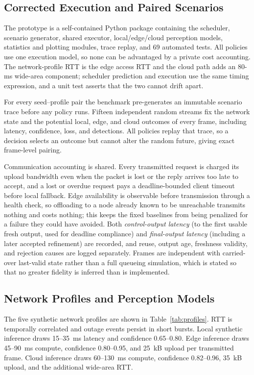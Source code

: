 \documentclass[conference,a4paper]{IEEEtran}
\begin{document}
\subsection{Corrected Execution and Paired Scenarios}
The prototype is a self-contained Python package containing the scheduler, scenario generator, shared executor, local/edge/cloud perception models, statistics and plotting modules, trace replay, and 69 automated tests. All policies use one execution model, so none can be advantaged by a private cost accounting. The network-profile RTT is the edge access RTT and the cloud path adds an 80-ms wide-area component; scheduler prediction and execution use the same timing expression, and a unit test asserts that the two cannot drift apart.

For every seed--profile pair the benchmark pre-generates an immutable scenario trace before any policy runs. Fifteen independent random streams fix the network state and the potential local, edge, and cloud outcomes of every frame, including latency, confidence, loss, and detections. All policies replay that trace, so a decision selects an outcome but cannot alter the random future, giving exact frame-level pairing.

Communication accounting is shared. Every transmitted request is charged its upload bandwidth even when the packet is lost or the reply arrives too late to accept, and a lost or overdue request pays a deadline-bounded client timeout before local fallback. Edge availability is observable before transmission through a health check, so offloading to a node already known to be unreachable transmits nothing and costs nothing; this keeps the fixed baselines from being penalized for a failure they could have avoided. Both \emph{control-output latency} (to the first usable fresh output, used for deadline compliance) and \emph{final-output latency} (including a later accepted refinement) are recorded, and reuse, output age, freshness validity, and rejection causes are logged separately. Frames are independent with carried-over last-valid state rather than a full queueing simulation, which is stated so that no greater fidelity is inferred than is implemented.

\subsection{Network Profiles and Perception Models}
The five synthetic network profiles are shown in Table~\ref{tab:profiles}. RTT is temporally correlated and outage events persist in short bursts. Local synthetic inference draws 15--35~ms latency and confidence 0.65--0.80. Edge inference draws 45--90~ms compute, confidence 0.80--0.95, and 25~kB upload per transmitted frame. Cloud inference draws 60--130~ms compute, confidence 0.82--0.96, 35~kB upload, and the additional wide-area RTT.
\end{document}
